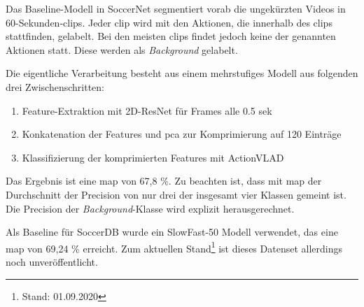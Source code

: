 Das Baseline-Modell in SoccerNet segmentiert vorab die ungekürzten Videos in 60-Sekunden-\glspl{clip}.
Jeder \gls{clip} wird mit den Aktionen, die innerhalb des \glspl{clip} stattfinden, gelabelt.
Bei den meisten \glspl{clip} findet jedoch keine der genannten Aktionen statt.
Diese werden als \emph{Background} gelabelt.

Die eigentliche Verarbeitung besteht aus einem mehrstufiges Modell aus folgenden drei Zwischenschritten:

\begin{enumerate}
    \item Feature-Extraktion mit 2D-ResNet für Frames alle 0.5 sek
    \item Konkatenation der Features und \gls{pca} zur Komprimierung auf 120 Einträge
    \item Klassifizierung der komprimierten Features mit ActionVLAD
\end{enumerate}

Das Ergebnis ist eine \gls{map} von 67,8 \%.
Zu beachten ist, dass mit \gls{map} der Durchschnitt der Precision von nur drei der insgesamt vier Klassen gemeint ist.
Die Precision der \emph{Background}-Klasse wird explizit herausgerechnet.

Als Baseline für SoccerDB wurde ein SlowFast-50 Modell verwendet, das eine \gls{map} von 69,24 \% erreicht.
Zum aktuellen Stand\footnote{Stand: 01.09.2020} ist dieses Datenset allerdings noch unveröffentlicht.
